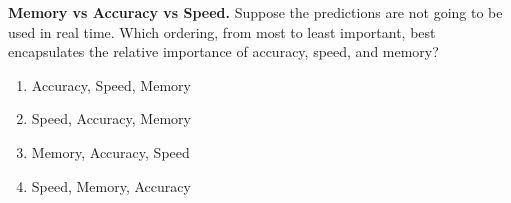\item {}
\textbf{Memory vs Accuracy vs Speed.}
Suppose the predictions are not going to be used in real time. Which ordering, from most to least important, best encapsulates the relative importance of accuracy, speed, and memory?

\begin{enumerate}[label=(\alph*)]
    \item Accuracy, Speed, Memory 
    \item Speed, Accuracy, Memory 
    \item Memory, Accuracy, Speed
    \item Speed, Memory, Accuracy
\end{enumerate} 
